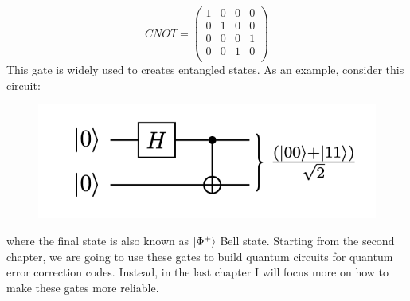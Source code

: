 \begin{equation*}
    CNOT =  \left(\begin{array}{cccc}
1 & 0 & 0 & 0\\
0 & 1 & 0 & 0\\
0 & 0 & 0 & 1\\
0 & 0 & 1 & 0\\
\end{array}\right)  
\end{equation*}
This gate is widely used to creates
entangled states. As an example, consider this circuit: 
\begin{figure}[h!]
    \centering
    \includegraphics[scale=0.5]{Mainmatter/images/CNOT_entangled.png}
\end{figure}


where the final state is also known as $\ket{\Phi^+}$ Bell state.
Starting from the second chapter, we are going to use these gates to build quantum circuits for quantum error correction codes. Instead, in the last chapter I will focus more on how to make these gates more reliable. 